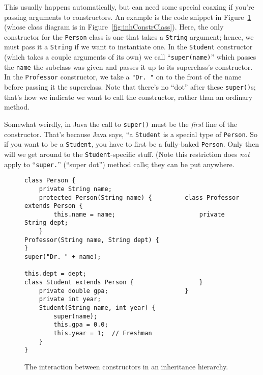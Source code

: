 This usually happens automatically, but can need some special coaxing if
you're passing arguments to constructors. An example is the code snippet in
Figure~\ref{fig:inhConstrCode} (whose class diagram is in
Figure~\ref{fig:inhConstrClass}). Here, the only constructor for the
\texttt{Person} class is one that takes a \texttt{String} argument; hence, we
must pass it a \texttt{String} if we want to instantiate one. In the
\texttt{Student} constructor (which takes a couple arguments of its own) we
call ``\texttt{super(name)}'' which passes the \texttt{name} the subclass was
given and passes it up to its superclass's constructor. In the
\texttt{Professor} constructor, we take a \texttt{"Dr. "} on to the front of
the name before passing it the superclass. Note that there's no ``dot'' after
these \texttt{super()}s; that's how we indicate we want to call the
constructor, rather than an ordinary method.

Somewhat weirdly, in Java the call to \texttt{super()} must be the
\textit{first} line of the constructor. That's because Java says, ``a
\texttt{Student} is a special type of \texttt{Person}. So if you want to be a
\texttt{Student}, you have to first be a fully-baked \texttt{Person}. Only
then will we get around to the \texttt{Student}-specific stuff. (Note this
restriction does \textit{not} apply to ``\texttt{super.}'' (``super dot'')
method calls; they can be put anywhere.

\begin{figure}[ht]
\begin{Verbatim}[fontsize=\scriptsize,samepage=true,frame=single]
class Person {                    
    private String name;          
    protected Person(String name) {         class Professor extends Person {
        this.name = name;                       private String dept;
    }                                           Professor(String name, String dept) {
}                                                   super("Dr. " + name);
                                                    this.dept = dept;
class Student extends Person {                  }
    private double gpa;                     }
    private int year;
    Student(String name, int year) {
        super(name);
        this.gpa = 0.0;
        this.year = 1;  // Freshman
    }
}
\end{Verbatim}
\caption{The interaction between constructors in an inheritance hierarchy.}
\label{fig:inhConstrCode}
\end{figure}

